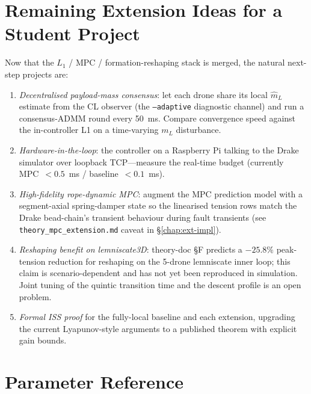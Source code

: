 \documentclass[11pt,a4paper,oneside]{report}
\begin{document}


\chapter{Remaining Extension Ideas for a Student Project}
\label{chap:ext}

Now that the $L_1$ / MPC / formation-reshaping stack is merged, the
natural next-step projects are:

\begin{enumerate}
\item \emph{Decentralised payload-mass consensus}: let each drone share
its local $\hat{m}_L$ estimate from the CL observer (the
\texttt{--adaptive} diagnostic channel) and run a consensus-ADMM round
every 50~ms. Compare convergence speed against the in-controller L1
on a time-varying $m_L$ disturbance.
\item \emph{Hardware-in-the-loop}: the controller on a Raspberry Pi
talking to the Drake simulator over loopback TCP---measure the
real-time budget (currently MPC~$<0.5$~ms / baseline~$<0.1$~ms).
\item \emph{High-fidelity rope-dynamic MPC}: augment the MPC prediction
model with a segment-axial spring-damper state so the linearised
tension rows match the Drake bead-chain's transient behaviour during
fault transients (see \texttt{theory\_mpc\_extension.md} caveat in \S\ref{chap:ext-impl}).
\item \emph{Reshaping benefit on lemniscate3D}: theory-doc \S F predicts
a \(-25.8\%\) peak-tension reduction for reshaping on the 5-drone
lemniscate inner loop; this claim is scenario-dependent and has not
yet been reproduced in simulation. Joint tuning of the quintic
transition time and the descent profile is an open problem.
\item \emph{Formal ISS proof} for the fully-local baseline and each
extension, upgrading the current Lyapunov-style arguments to a
published theorem with explicit gain bounds.
\end{enumerate}

\appendix

\chapter{Parameter Reference}
\label{chap:params}
\end{document}
